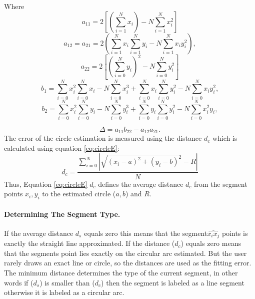 Where 
\begin{equation}
a_{11}  = 2\left[ {\left( {\sum\limits_{i = 1}^N {x_i } } \right) - N\sum\limits_{i = 1}^N {x_i^2 } } \right]
\end{equation}
\begin{equation}
a_{12}  = a_{21}  = 2\left( {\sum\limits_{i = 1}^N {x_i \sum\limits_{i = 1}^N {y_i } }  - N\sum\limits_{i = 1}^N {x_i y_i^2 } } \right),
\end{equation}
\begin{equation}
 a_{22}  = 2\left[ {\left( {\sum\limits_{i = 0}^N {y_i } } \right)^2  - N\sum\limits_{i = 0}^N {y_i^2 } } \right]
\end{equation}
\begin{equation}
b_1  = \sum\limits_{i = 0}^N {x_i^2 } \sum\limits_{i = 0}^N {x_i }  - N\sum\limits_{i = 0}^N {x_i^3 }  + \sum\limits_{i = 0}^N {x_i } \sum\limits_{i = 0}^N {y_i^2 }  - N\sum\limits_{i = 0}^N {x_i y_i^2 } , 
\end{equation}
\begin{equation}
b_2  = \sum\limits_{i = 0}^N {x_i^2 } \sum\limits_{i = 0}^N {y_i }  - N\sum\limits_{i = 0}^N {y_i^3 }  + \sum\limits_{i = 0}^N {y_i } \sum\limits_{i = 0}^N {y_i^2 }  - N\sum\limits_{i = 0}^N {x_i^2 y_i } ,
\end{equation}

\begin{equation}
\Delta  = a_{11}b_{22}-a_{12}a_{21}.
\end{equation}
 The error of the circle estimation is measured using the distance $d_c$ which is calculated using equation \ref{eq:circleE}:
 \begin{equation}
 \label{eq:circleE}
d_c  = \frac{{\sum\limits_{i = 0}^N {\left| {\sqrt {(x_i  - a)^2  + (y_i  - b)^2 }  - R} \right|} }}{N}
\end{equation}
Thus, Equation \ref{eq:circleE} $d_c$ defines the average distance $d_c$ from the segment points $x_i,y_i$ to the estimated circle ($a,b$) and $R$.

\paragraph{Determining The Segment Type.} 
\label{sec:DeterminigSegmentType}
If the average distance $d_s$ equals zero this means that the segment$\widehat{x_ix_j}$ points is exactly the straight line approximated. If the distance ($d_c$) equals zero means that the segments point lies exactly on the circular arc estimated. But the user rarely draws an exact line or circle, so the distances are used as the fitting error. The minimum distance determines the type of the current segment, in other words if ($d_s$) is smaller than ($d_c$) then the segment is labeled as a line segment otherwise it is labeled as a circular arc. 


